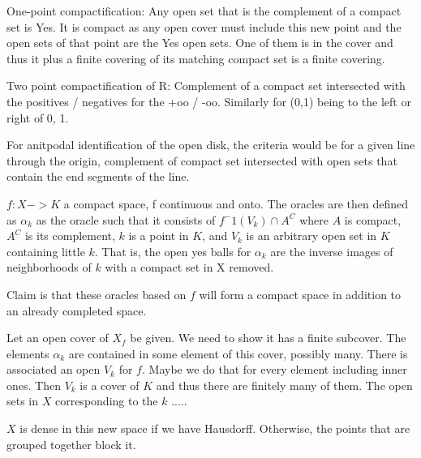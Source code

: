 \documentclass[12pt]{article}
\begin{document}
One-point compactification: Any open set that is the complement of a compact set is Yes. It is compact as any open cover must include this new point and the open sets of that point are the Yes open sets. One of them is in the cover and thus it plus a finite covering of its matching compact set is a finite covering. 

Two point compactification of R: Complement of a compact set intersected with the positives / negatives for the +oo / -oo.  Similarly for (0,1) being to the left or right of 0, 1. 

For anitpodal identification of the open disk, the criteria would be for a given line through the origin, complement of compact set intersected with open sets that contain the end segments of the line. 

$f: X -> K$ a compact space, f continuous and onto. The oracles are then defined as $\alpha_k$ as the oracle such that it consists of $f^-1(V_k) \cap A^C$ where $A$ is compact, $A^C$ is its complement, $k$ is a point in $K$, and $V_k$ is an arbitrary open set in $K$ containing little $k$. That is, the open yes balls for $\alpha_k$ are the inverse images of neighborhoods of $k$ with a compact set in X removed. 

Claim is that these oracles based on $f$ will form a compact space in addition to an already completed space. 

Let an open cover of $X_f$ be given. We need to show it has a finite subcover. The elements $\alpha_k$ are contained in some element of this cover, possibly many. There is associated an open $V_k$ for $f$. Maybe we do that for every element including inner ones. Then $V_k$ is a cover of $K$ and thus there are finitely many of them. The open sets in $X$ corresponding to the $k$ .....

$X$ is dense in this new space if we have Hausdorff. Otherwise, the points that are grouped together block it. 





\medskip

\normalem %
\printbibliography
\end{document}
